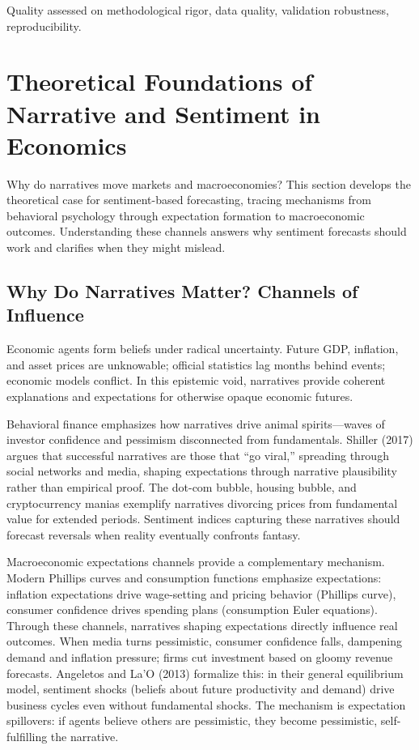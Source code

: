 \documentclass[11pt,twocolumn]{article}
\begin{document}
Quality assessed on methodological rigor, data quality, validation robustness, reproducibility.

\section{Theoretical Foundations of Narrative and Sentiment in Economics}

Why do narratives move markets and macroeconomies? This section develops the theoretical case for sentiment-based forecasting, tracing mechanisms from behavioral psychology through expectation formation to macroeconomic outcomes. Understanding these channels answers why sentiment forecasts should work and clarifies when they might mislead.

\subsection{Why Do Narratives Matter? Channels of Influence}

Economic agents form beliefs under radical uncertainty. Future GDP, inflation, and asset prices are unknowable; official statistics lag months behind events; economic models conflict. In this epistemic void, narratives provide coherent explanations and expectations for otherwise opaque economic futures.

Behavioral finance emphasizes how narratives drive animal spirits---waves of investor confidence and pessimism disconnected from fundamentals. Shiller (2017) argues that successful narratives are those that ``go viral,'' spreading through social networks and media, shaping expectations through narrative plausibility rather than empirical proof. The dot-com bubble, housing bubble, and cryptocurrency manias exemplify narratives divorcing prices from fundamental value for extended periods. Sentiment indices capturing these narratives should forecast reversals when reality eventually confronts fantasy.

Macroeconomic expectations channels provide a complementary mechanism. Modern Phillips curves and consumption functions emphasize expectations: inflation expectations drive wage-setting and pricing behavior (Phillips curve), consumer confidence drives spending plans (consumption Euler equations). Through these channels, narratives shaping expectations directly influence real outcomes. When media turns pessimistic, consumer confidence falls, dampening demand and inflation pressure; firms cut investment based on gloomy revenue forecasts. Angeletos and La'O (2013) formalize this: in their general equilibrium model, sentiment shocks (beliefs about future productivity and demand) drive business cycles even without fundamental shocks. The mechanism is expectation spillovers: if agents believe others are pessimistic, they become pessimistic, self-fulfilling the narrative.
\end{document}
